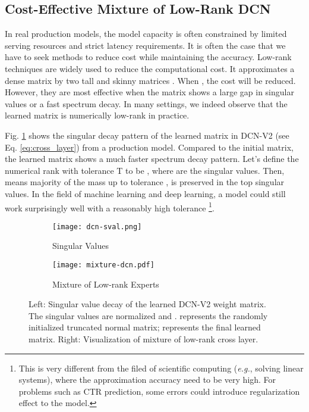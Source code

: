 \documentclass[sigconf]{acmart}
\begin{document}
\subsection{Cost-Effective Mixture of Low-Rank DCN}
In real production models, the model capacity is often constrained by limited serving resources and strict latency requirements. It is often the case that we have to seek methods to reduce cost while maintaining the accuracy. Low-rank techniques \cite{golub1996matrix} are widely used \cite{jaderberg2014speeding, yu2017compressing, chen2018adaptive, wang2019block, halko2011finding, drineas2005nystrom} to reduce the computational cost. It approximates a dense matrix  by two tall and skinny matrices . When , the cost will be reduced. However, they are most effective when the matrix shows a large gap in singular values or a fast spectrum decay. In many settings, we indeed observe that the learned matrix is numerically low-rank in practice.

Fig. \ref{fig:dcn-sval} shows the singular decay pattern of the learned matrix  in {DCN-V2} (see Eq. \eqref{eq:cross_layer}) from a production model. Compared to the initial matrix, the learned matrix shows a much faster spectrum decay pattern. Let's define the numerical rank  with tolerance T to be , where  are the singular values. Then,  means majority of the mass up to tolerance , is preserved in the top  singular values. In the field of machine learning and deep learning, a model could still work surprisingly well with a reasonably high tolerance  \footnote{This is very different from the filed of scientific computing (\emph{e.g.}, solving linear systems), where the approximation accuracy need to be very high. For problems such as CTR prediction, some errors could introduce regularization effect to the model.}.


\begin{figure}[htbp]
\centering
    \begin{subfigure}[b]{0.2\textwidth}  
    \texttt{[image: dcn-sval.png]}
    \caption{Singular Values}
    \label{fig:dcn-sval}
    \end{subfigure}
    \hfill
    \begin{subfigure}[b]{0.23\textwidth}  
    \texttt{[image: mixture-dcn.pdf]}
    \caption{Mixture of Low-rank Experts}
    \label{fig:mixture-dcn}
    \end{subfigure}
    \caption{Left: Singular value decay of the learned {DCN-V2} weight matrix. The singular values are normalized and . {\color{orange}} represents the randomly initialized truncated normal matrix; {\color{blue}} represents the final learned matrix. Right: Visualization of mixture of low-rank cross layer.}
\end{figure}
\end{document}
